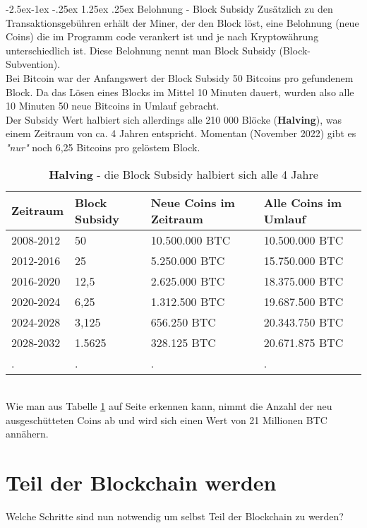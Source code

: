 \documentclass[10pt,a4paper,titlepage]{paper}
\makeatletter
\renewcommand\paragraph{\@startsection{paragraph}{4}{\z@}%
            {-2.5ex\@plus -1ex \@minus -.25ex}%
            {1.25ex \@plus .25ex}%
            {\normalfont\normalsize\bfseries}}
\makeatother
\begin{document}
\paragraph{Belohnung - Block Subsidy}
Zusätzlich zu den Transaktionsgebühren
erhält der Miner, der den Block löst, eine Belohnung (neue Coins) die im Programm code verankert ist und je nach Kryptowährung unterschiedlich ist. Diese Belohnung nennt man Block Subsidy (Block-Subvention).\\
Bei Bitcoin war der Anfangswert der Block Subsidy 50 Bitcoins pro gefundenem Block. Da das Lösen eines Blocks im Mittel 10 Minuten dauert, wurden also alle 10 Minuten 50 neue Bitcoins in Umlauf gebracht.\\
Der Subsidy Wert halbiert sich allerdings alle 210 000 Blöcke (\textbf{Halving}), was einem Zeitraum von ca. 4 Jahren entspricht. Momentan (November 2022) gibt es \textit{"nur"} noch 6,25 Bitcoins pro gelöstem Block.
\begin{table}[h]
\centering
\begin{tabular}{|p{2cm}|p{2.5cm}|p{3.8cm}|p{3.7cm}|}
\hline 
\textbf{Zeitraum} &	\textbf{Block Subsidy} & \textbf{Neue Coins im Zeitraum} & \textbf{Alle Coins im Umlauf} \\
\hline 
2008-2012 & 50 & 10.500.000 BTC & 10.500.000 BTC\\
\hline
2012-2016 & 25 & 5.250.000 BTC & 15.750.000 BTC\\
\hline
2016-2020 & 12,5 & 2.625.000 BTC & 18.375.000 BTC\\
\hline
2020-2024 & 6,25 & 1.312.500 BTC & 19.687.500 BTC\\
\hline
2024-2028 & 3,125 & 656.250 BTC & 20.343.750 BTC\\
\hline
2028-2032 & 1.5625 & 328.125 BTC & 20.671.875 BTC\\
\hline 
. & . & . & .\\
\hline 
\end{tabular}
\caption{\textbf{Halving} - die Block Subsidy halbiert sich alle 4 Jahre}
\label{tabelle_1} 
\end{table}\\ 
Wie man aus Tabelle \ref{tabelle_1} auf Seite \pageref{tabelle_1} erkennen kann, nimmt die Anzahl der neu ausgeschütteten Coins ab und wird sich einen Wert von 21 Millionen BTC 
annähern.

\section{Teil der Blockchain werden}
Welche Schritte sind nun notwendig um selbst Teil der Blockchain zu werden?
\end{document}
